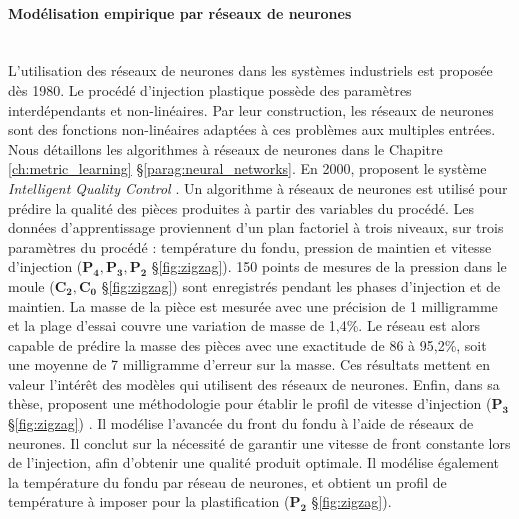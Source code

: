 \paragraph{Modélisation empirique par réseaux de neurones}\mbox{} \\
L'utilisation des réseaux de neurones dans les systèmes industriels est proposée dès 1980.
Le procédé d'injection plastique possède des paramètres interdépendants et non-linéaires.
Par leur construction, les réseaux de neurones sont des fonctions non-linéaires adaptées à ces problèmes aux multiples entrées.
Nous détaillons les algorithmes à réseaux de neurones dans le Chapitre \ref{ch:metric_learning} §\ref{parag:neural_networks}.
En 2000, \citeauthor{schnerr-haselbarth_automation_2000} proposent le système \textit{Intelligent Quality Control} \cite{schnerr-haselbarth_automation_2000}.
Un algorithme à réseaux de neurones est utilisé pour prédire la qualité des pièces produites à partir des variables du procédé.
Les données d’apprentissage proviennent d’un plan factoriel à trois niveaux, sur trois paramètres du procédé : température du fondu, pression de maintien et vitesse d’injection ($\boldsymbol{P_4, P_3, P_2}$ §\ref{fig:zigzag}).
150 points de mesures de la pression dans le moule ($\boldsymbol{C_2, C_0}$ §\ref{fig:zigzag}) sont enregistrés pendant les phases d’injection et de maintien.
La masse de la pièce est mesurée avec une précision de 1 milligramme et la plage d’essai couvre une variation de masse de 1,4\%.
Le réseau est alors capable de prédire la masse des pièces avec une exactitude de 86 à 95,2\%, soit une moyenne de 7 milligramme d’erreur sur la masse.
Ces résultats mettent en valeur l'intérêt des modèles qui utilisent des réseaux de neurones.
Enfin, dans sa thèse, \citeauthor{chen_characteristics_2002} proposent une méthodologie pour établir le profil de vitesse d’injection ($\boldsymbol{P_3}$ §\ref{fig:zigzag}) \cite{chen_characteristics_2002}.
Il modélise l’avancée du front du fondu à l'aide de réseaux de neurones.
Il conclut sur la nécessité de garantir une vitesse de front constante lors de l'injection, afin d’obtenir une qualité produit optimale.
Il modélise également la température du fondu par réseau de neurones, et obtient un profil de température à imposer pour la plastification ($\boldsymbol{P_2}$ §\ref{fig:zigzag}).

